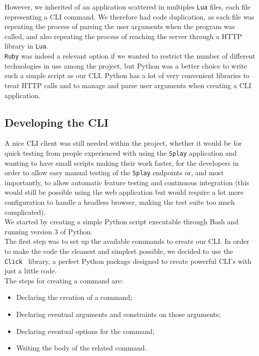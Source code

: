 \documentclass{eplmastersthesis}
\begin{document}
        However, we inherited of an application scattered in multiples \texttt{Lua}
        files, each file representing a CLI command. We therefore had code
        duplication, as each file was repeating the process of parsing the user
        arguments when the program was called, and also repeating the process
        of reaching the server through a HTTP library in \texttt{Lua}.\\
        \texttt{Ruby} was indeed a relevant option if we wanted to restrict the number
        of different technologies in use among the project, but Python was
        a better choice to write such a simple script as our CLI. Python has
        a lot of very convenient libraries to treat HTTP calls and to
        manage and parse user arguments when creating a CLI application.

      \subsection{Developing the CLI}

        A nice CLI client was still needed within the project, whether it
        would be for quick testing from people experienced with using the
        \texttt{Splay} application and wanting to have small scripts making their
        work faster, for the developers in order to allow easy manual testing
        of the \texttt{Splay} endpoints or, and most importantly, to allow automatic
        feature testing and continuous integration (this would still be
        possible using the web application but would require a lot more
        configuration to handle a headless browser, making the test suite
        too much complicated).\\

        We started by creating a simple Python script executable
        through Bash and running version 3 of Python.\\

        The first step was to set up the available commands to create our CLI.
        In order to make the code the cleanest and simplest possible, we
        decided to use the \texttt{Click}~\cite{click} library, a perfect
        Python package designed to create powerful CLI's with just a little
        code.\\
        The steps for creating a command are:

        \begin{itemize}
          \item Declaring the creation of a command;
          \item Declaring eventual arguments and constraints on those arguments;
          \item Declaring eventual options for the command;
          \item Writing the body of the related command.
        \end{itemize}
\end{document}
